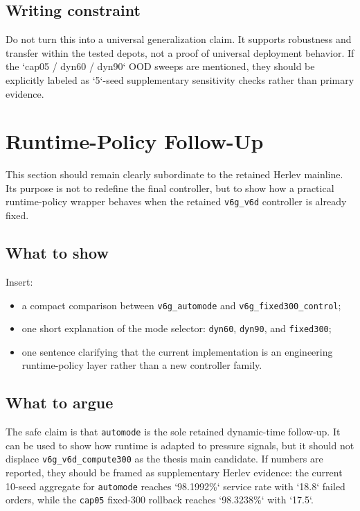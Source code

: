 \subsection{Writing constraint}
\label{sec:results-ood-constraint}

Do not turn this into a universal generalization claim.
It supports robustness and transfer within the tested depots, not a proof of universal deployment behavior.
If the `cap05 / dyn60 / dyn90` OOD sweeps are mentioned, they should be explicitly labeled as `5`-seed supplementary sensitivity checks rather than primary evidence.

\section{Runtime-Policy Follow-Up}
\label{sec:results-runtime-policy}

This section should remain clearly subordinate to the retained Herlev mainline.
Its purpose is not to redefine the final controller, but to show how a practical runtime-policy wrapper behaves when the retained \texttt{v6g\_v6d} controller is already fixed.

\subsection{What to show}
\label{sec:results-runtime-show}

Insert:
\begin{itemize}
    \item a compact comparison between \texttt{v6g\_automode} and \texttt{v6g\_fixed300\_control};
    \item one short explanation of the mode selector: \texttt{dyn60}, \texttt{dyn90}, and \texttt{fixed300};
    \item one sentence clarifying that the current implementation is an engineering runtime-policy layer rather than a new controller family.
\end{itemize}

\subsection{What to argue}
\label{sec:results-runtime-argue}

The safe claim is that \texttt{automode} is the sole retained dynamic-time follow-up.
It can be used to show how runtime is adapted to pressure signals, but it should not displace \texttt{v6g\_v6d\_compute300} as the thesis main candidate.
If numbers are reported, they should be framed as supplementary Herlev evidence: the current 10-seed aggregate for \texttt{automode} reaches `98.1992\%` service rate with `18.8` failed orders, while the \texttt{cap05} fixed-\num{300} rollback reaches `98.3238\%` with `17.5`.

